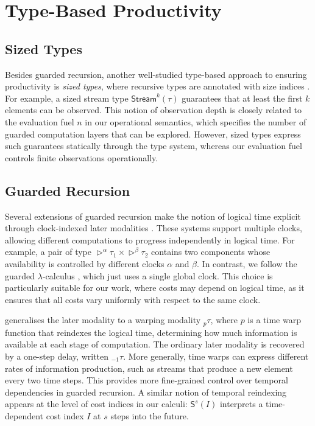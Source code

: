 \section{Type-Based Productivity}
\label{sec:rw-productivity}

\subsection{Sized Types}
Besides guarded recursion, another well-studied type-based approach to ensuring productivity is \emph{sized types},
where recursive types are annotated with size indices \citep{hughesPS96}. 
For example, a sized stream type $\mathsf{Stream}^{k}(\tau)$ guarantees that at least the first $k$ elements can be observed.
This notion of observation depth is closely related to the evaluation fuel $n$ in our operational semantics, 
which specifies the number of guarded computation layers that can be explored. However, sized types express such guarantees statically through the type system,
whereas our evaluation fuel controls finite observations operationally.

\subsection{Guarded Recursion}
\label{sec:guarded-related-work}
Several extensions of guarded recursion make the notion of logical
time explicit through clock-indexed later modalities
\citep{atkeyProductiveCoprogrammingGuarded2013a,mogelberg14,
bahrClocksAreTicking2017}.
These systems support multiple clocks, allowing different
computations to progress independently in logical time.
For example, a pair of type
$\triangleright^\alpha \tau_1 \times \triangleright^\beta \tau_2$
contains two components whose availability is controlled by
different clocks $\alpha$ and $\beta$.
In contrast, we follow the guarded $\lambda$-calculus
\citep{cloustonGuardedLambdaCalculusProgramming2017a},
which just uses a single global clock.
This choice is particularly suitable for our work, where
costs may depend on logical time, as it ensures that
all costs vary uniformly with respect to the
same clock.

\cite{guattoGeneralizedModalityRecursion2018d} generalises the later modality to a warping modality $_p\tau$, where $p$ is a time warp function that reindexes the logical time, 
determining how much information is available at each stage of computation. 
The ordinary later modality is recovered by a one-step delay, written $_{-1}\tau$. 
More generally, time warps can express different rates of information production, 
such as streams that produce a new element every two time steps. 
This provides more fine-grained control over temporal dependencies in guarded recursion. 
A similar notion of temporal reindexing appears at the level of cost indices in our calculi: $\mathsf{S}^{s}(I)$ interprets a time-dependent cost index $I$ at $s$ steps into the future.


